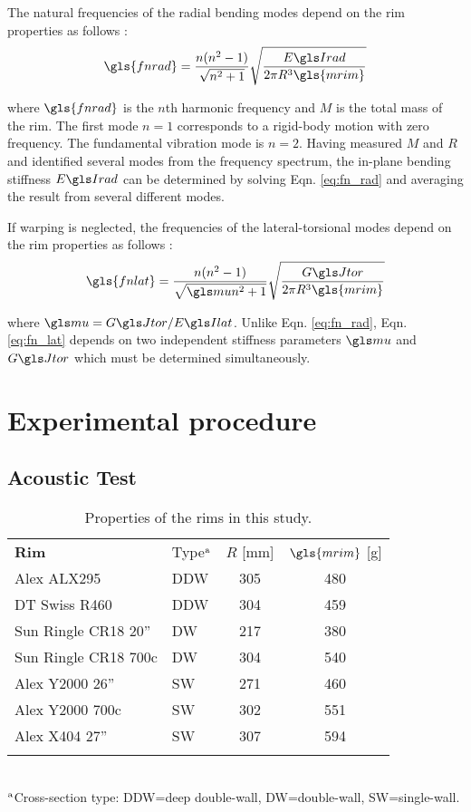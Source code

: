 \documentclass[../thesis.tex]{subfiles}
\begin{document}
The natural frequencies of the radial bending modes depend on the rim properties as follows \cite{Timoshenko1955}:
  \begin{equation}\label{eq:fn_rad}
  \gls{fnrad} = \frac{n(n^2-1)}{\sqrt{n^2+1}} \sqrt{\frac{\EIr}{2\pi R^3 \gls{mrim}}}
  \end{equation}

where $\gls{fnrad}$ is the $n$th harmonic frequency and $M$ is the total mass of the rim. The first mode $n=1$ corresponds to a rigid-body motion with zero frequency. The fundamental vibration mode is $n=2$. Having measured $M$ and $R$ and identified several modes from the frequency spectrum, the in-plane bending stiffness $\EIr$ can be determined by solving Eqn. \eqref{eq:fn_rad} and averaging the result from several different modes.

If warping is neglected, the frequencies of the lateral-torsional modes depend on the rim properties as follows \cite{Timoshenko1955}:
  \begin{equation}\label{eq:fn_lat}
  \gls{fnlat} = \frac{n(n^2-1)}{\sqrt{\m n^2+1}} \sqrt{\frac{\GJ}{2\pi R^3 \gls{mrim}}}
  \end{equation}

where $\m=\GJ/\EIl$. Unlike Eqn. \eqref{eq:fn_rad}, Eqn. \eqref{eq:fn_lat} depends on two independent stiffness parameters $\m$ and $\GJ$ which must be determined simultaneously.


\section{Experimental procedure}

\subsection{Acoustic Test}

  \begin{table}
  \caption{Properties of the rims in this study.\label{tb:rims}}
  \begin{tabular}{@{}llcc}
  \hline\noalign{\smallskip}
  \bf{Rim} & Type$^{\rm a}$ & $R$ [mm] & $\gls{mrim}$ [g]\\
  \noalign{\smallskip}\hline\noalign{\smallskip}
  Alex ALX295          & DDW & 305 & 480\\
  DT Swiss R460        & DDW & 304 & 459\\
  Sun Ringle CR18 20'' & DW  & 217 & 380\\
  Sun Ringle CR18 700c & DW  & 304 & 540\\
  Alex Y2000 26''      & SW  & 271 & 460\\
  Alex Y2000 700c      & SW  & 302 & 551\\
  Alex X404 27''       & SW  & 307 & 594\\
  \noalign{\smallskip}\hline
  \end{tabular}\\
  $^{\rm a}$Cross-section type: DDW=deep double-wall, DW=double-wall, SW=single-wall.
  \end{table}
\end{document}
